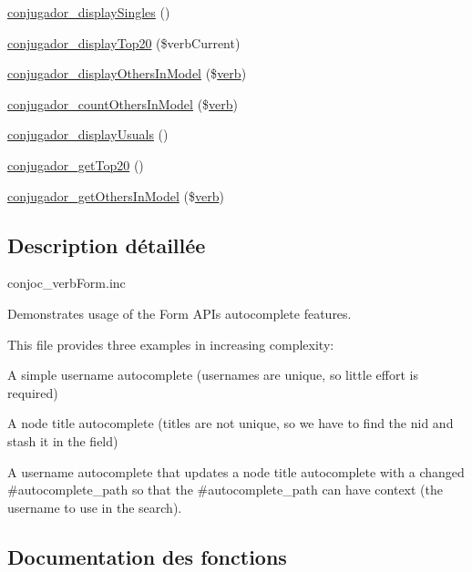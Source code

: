 \begin{DoxyCompactItemize}
\item 
\hyperlink{php_2conjoc__web_form_8inc_ac41ee7cf6ccd6dd46de8112c7c315cfe}{conjugador\+\_\+display\+Singles} ()
\item 
\hyperlink{php_2conjoc__web_form_8inc_adfb69460570fdffecec436447f5ed729}{conjugador\+\_\+display\+Top20} (\$verb\+Current)
\item 
\hyperlink{php_2conjoc__web_form_8inc_a64885b968e081840d6a10adc2a38db9e}{conjugador\+\_\+display\+Others\+In\+Model} (\$\hyperlink{teibase_8php_aa8d8fadfcf4239c7aa288414da9d0ace}{verb})
\item 
\hyperlink{php_2conjoc__web_form_8inc_ac96a30f96cb3957ed4ac47c4eb40df10}{conjugador\+\_\+count\+Others\+In\+Model} (\$\hyperlink{teibase_8php_aa8d8fadfcf4239c7aa288414da9d0ace}{verb})
\item 
\hyperlink{php_2conjoc__web_form_8inc_a1bfbce593ac5c763b1542fa713249aa3}{conjugador\+\_\+display\+Usuals} ()
\item 
\hyperlink{php_2conjoc__web_form_8inc_a9ab9dfc2c3015a0855c27f37812bb897}{conjugador\+\_\+get\+Top20} ()
\item 
\hyperlink{php_2conjoc__web_form_8inc_a90ac7751a59eefed3b3576f1cedb016f}{conjugador\+\_\+get\+Others\+In\+Model} (\$\hyperlink{teibase_8php_aa8d8fadfcf4239c7aa288414da9d0ace}{verb})
\end{DoxyCompactItemize}


\subsection{Description détaillée}
conjoc\+\_\+verb\+Form.\+inc

Demonstrates usage of the Form A\+PI\textquotesingle{}s autocomplete features.

This file provides three examples in increasing complexity\+:
\begin{DoxyItemize}
\item A simple username autocomplete (usernames are unique, so little effort is required)
\item A node title autocomplete (titles are not unique, so we have to find the nid and stash it in the field)
\item A username autocomplete that updates a node title autocomplete with a changed \#autocomplete\+\_\+path so that the \#autocomplete\+\_\+path can have context (the username to use in the search). 
\end{DoxyItemize}

\subsection{Documentation des fonctions}
\hypertarget{php_2conjoc__web_form_8inc_a3698c970fd73cda200a3a459dc50beec}{}\label{php_2conjoc__web_form_8inc_a3698c970fd73cda200a3a459dc50beec} 
